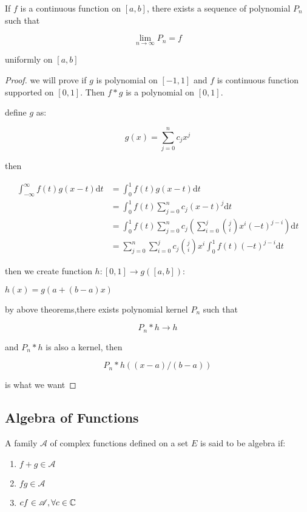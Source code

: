 \begin{thm}
    If $f$ is a continuous function on $[a,b]$, there exists a sequence
    of polynomial $P_n$ such that

    \[
        \lim_{n \to \infty}P_n = f
    \]

    uniformly on $[a,b]$
\end{thm}

\begin{proof}
    we will prove if $g$ is polynomial on $[-1,1]$ and $f$ is continuous function supported on $[0,1]$.
    Then $f \ast g$ is a polynomial on $[0,1]$.

    define $g$ as:

    \[
        g(x) = \sum_{j=0}^{n}c_j x^j
    \]

    then

    \begin{align*}
        \int_{-\infty}^{\infty}f(t)g(x-t) \mathrm{d}t &= \int_{0}^{1}f(t)g(x-t) \mathrm{d}t \\
        &= \int_{0}^{1}f(t)\sum_{j=0}^{n}c_j (x-t)^j \mathrm{d}t \\
        &= \int_{0}^{1}f(t)\sum_{j=0}^{n}c_j \left(\sum_{i=0}^{j}\binom{j}{i}x^{i}(-t)^{j-i} \right) \mathrm{d}t \\
        &= \sum_{j=0}^{n}\sum_{i=0}^{j}  c_j \binom{j}{i} x^i \int_{0}^{1} f(t)(-t)^{j-i} \mathrm{d}t
    \end{align*}

    then we create function $h: [0,1] \to g([a,b])$:

    $h(x)= g(a + (b-a)x)$

    by above theorems,there exists polynomial kernel $P_n$ such that

    \[
        P_n \ast h \to h
    \]

    and $P_n \ast h$ is also a kernel, then

    \[
        P_n \ast h ((x-a)/(b-a))
    \]

    is what we want
\end{proof}

\subsection{Algebra of Functions}

\begin{definition}
    A family $\mathscr{A}$ of complex functions defined on a set $E$
    is said to be algebra if:

    \begin{enumerate}
        \item $f+g \in \mathscr{A}$
        \item $fg \in \mathscr{A}$
        \item $cf \in \mathscr{A}, \forall c \in \mathbb{C}$
    \end{enumerate}

\end{definition}


